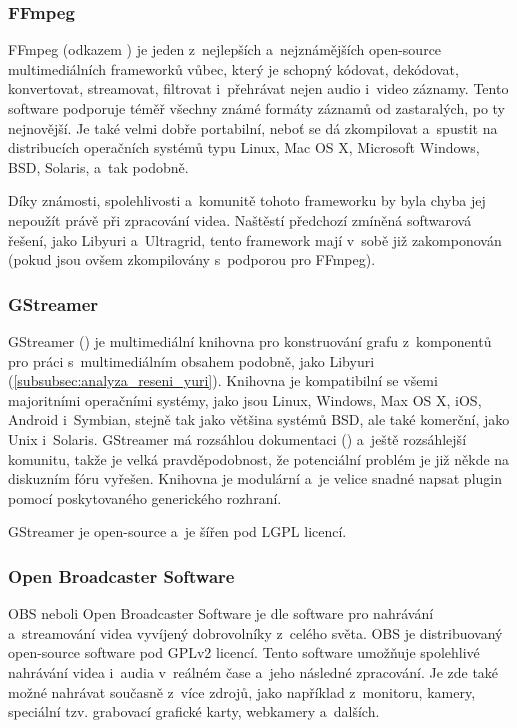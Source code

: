 \documentclass[thesis=M,czech]{FITthesis}[2012/06/26]
\begin{document}
\subsubsection{FFmpeg} \label{subsubsec:analyza_reseni_ffmpeg}
FFmpeg (odkazem \cite{ffmpeg}) je jeden z~nejlepších a~nejznámějších open-source multimediálních frameworků vůbec, který je schopný kódovat, dekódovat, konvertovat, streamovat, filtrovat i~přehrávat nejen audio i~video záznamy. Tento software podporuje téměř všechny známé formáty záznamů od zastaralých, po ty nejnovější. Je také velmi dobře portabilní, neboť se dá zkompilovat a~spustit na distribucích operačních systémů typu Linux, Mac OS X, Microsoft Windows, BSD, Solaris, a~tak podobně.

	Díky známosti, spolehlivosti a~komunitě tohoto frameworku by byla chyba jej nepoužít právě při zpracování videa. Naštěstí předchozí zmíněná softwarová řešení, jako Libyuri a~Ultragrid, tento framework mají v~sobě již zakomponován (pokud jsou ovšem zkompilovány s~podporou pro FFmpeg).

\subsubsection{GStreamer} \label{subsubsec:analyza_reseni_gstreamer}
GStreamer (\cite{gstreamer}) je multimediální knihovna pro konstruování grafu z~komponentů pro práci s~multimediálním obsahem podobně, jako Libyuri (\ref{subsubsec:analyza_reseni_yuri}). Knihovna je kompatibilní se všemi majoritními operačními systémy, jako jsou Linux, Windows, Max OS X, iOS, Android i~Symbian, stejně tak jako většina systémů BSD, ale také komerční, jako Unix i~Solaris. GStreamer má rozsáhlou dokumentaci (\cite{gstreamer_doc}) a~ještě rozsáhlejší komunitu, takže je velká pravděpodobnost, že potenciální problém je již někde na diskuzním fóru vyřešen. Knihovna je modulární a~je velice snadné napsat plugin pomocí poskytovaného generického rozhraní.

	GStreamer je open-source a~je šířen pod LGPL licencí.

\subsubsection{Open Broadcaster Software} \label{subsubsec:analyza_reseni_obs}
OBS neboli Open Broadcaster Software je dle \cite{obs} software pro nahrávání a~streamování videa vyvíjený dobrovolníky z~celého světa. OBS je distribuovaný open-source software pod GPLv2 licencí. Tento software umožňuje spolehlivé nahrávání videa i~audia v~reálném čase a~jeho následné zpracování. Je zde také možné nahrávat současně z~více zdrojů, jako například z~monitoru, kamery, speciální tzv. grabovací grafické karty, webkamery a~dalších.
\end{document}

